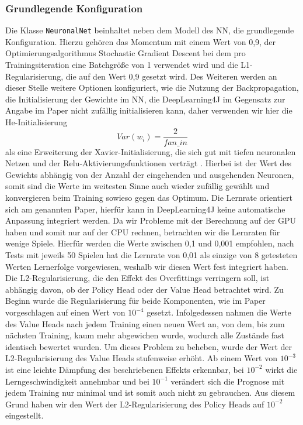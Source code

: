 \documentclass[12pt,a4paper]{article}
\begin{document}
\subsubsection{Grundlegende Konfiguration}
Die Klasse \texttt{NeuronalNet} beinhaltet neben dem Modell des NN, die grundlegende Konfiguration. Hierzu gehören das Momentum mit einem Wert von 0,9, der Optimierungsalgorithmus \glqq{}Stochastic Gradient Descent\grqq{} bei dem pro Trainingsiteration eine Batchgröße von 1 verwendet wird und die L1-Regularisierung, die auf den Wert 0,9 gesetzt wird. Des Weiteren werden an dieser Stelle weitere Optionen konfiguriert, wie die Nutzung der Backpropagation, die Initialisierung der Gewichte im NN, die DeepLearning4J im Gegensatz zur Angabe im Paper nicht zufällig initialisieren kann, daher verwenden wir hier die He-Initialisierung
\begin{equation}
Var(w_i) = \frac{2}{fan\_in}
\end{equation}
als eine Erweiterung der Xavier-Initialisierung, die sich gut mit tiefen neuronalen Netzen und der Relu-Aktivierungsfunktionen verträgt \cite{Ghatak.2019}. Hierbei ist der Wert des Gewichts abhängig von der Anzahl der eingehenden und ausgehenden Neuronen, somit sind die Werte im weitesten Sinne auch wieder zufällig gewählt und konvergieren beim Training sowieso gegen das Optimum. Die Lernrate orientiert sich am genannten Paper, hierfür kann in DeepLearning4J keine automatische Anpassung integriert werden. Da wir Probleme mit der Berechnung auf der GPU haben und somit nur auf der CPU rechnen, betrachten wir die Lernraten für wenige Spiele. Hierfür werden die Werte zwischen 0,1 und 0,001 empfohlen, nach Tests mit jeweils 50 Spielen hat die Lernrate von 0,01 als einzige von 8 getesteten Werten Lernerfolge vorgewiesen, weshalb wir diesen Wert fest integriert haben. Die L2-Regularisierung, die den Effekt des Overfittings verringern soll, ist abhängig davon, ob der Policy Head oder der Value Head betrachtet wird. Zu Beginn wurde die Regularisierung für beide Komponenten, wie im Paper vorgeschlagen auf einen Wert von $10^{-4}$ gesetzt. Infolgedessen nahmen die Werte des Value Heads nach jedem Training einen neuen Wert an, von dem, bis zum nächsten Training, kaum mehr abgewichen wurde, wodurch alle Zustände fast identisch bewertet wurden. Um dieses Problem zu beheben, wurde der Wert der L2-Regularisierung des Value Heads stufenweise erhöht. Ab einem Wert von $10^{-3}$ ist eine leichte Dämpfung des beschriebenen Effekts erkennbar, bei $10^{-2}$ wirkt die Lerngeschwindigkeit annehmbar und bei $10^{-1}$ verändert sich die Prognose mit jedem Training nur minimal und ist somit auch nicht zu gebrauchen. Aus diesem Grund haben wir den Wert der L2-Regularisierung des Policy Heads auf $10^{-2}$ eingestellt.\\
\end{document}
